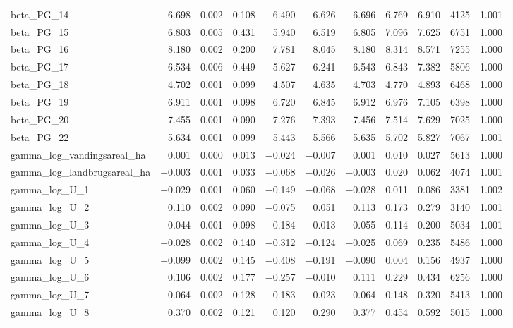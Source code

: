 \documentclass[12pt]{article}
\begin{document}
\begin{longtable}{lrrrrrrrrrr}
beta\_PG\_14 &  6.698 & 0.002 & 0.108 &  6.490 &  6.626 &  6.696 &  6.769 &  6.910 &  4125 & 1.001 \\
beta\_PG\_15 &  6.803 & 0.005 & 0.431 &  5.940 &  6.519 &  6.805 &  7.096 &  7.625 &  6751 & 1.000 \\
beta\_PG\_16 &  8.180 & 0.002 & 0.200 &  7.781 &  8.045 &  8.180 &  8.314 &  8.571 &  7255 & 1.000 \\
beta\_PG\_17 &  6.534 & 0.006 & 0.449 &  5.627 &  6.241 &  6.543 &  6.843 &  7.382 &  5806 & 1.000 \\
beta\_PG\_18 &  4.702 & 0.001 & 0.099 &  4.507 &  4.635 &  4.703 &  4.770 &  4.893 &  6468 & 1.000 \\
beta\_PG\_19 &  6.911 & 0.001 & 0.098 &  6.720 &  6.845 &  6.912 &  6.976 &  7.105 &  6398 & 1.000 \\
beta\_PG\_20 &  7.455 & 0.001 & 0.090 &  7.276 &  7.393 &  7.456 &  7.514 &  7.629 &  7025 & 1.000 \\
beta\_PG\_22 &  5.634 & 0.001 & 0.099 &  5.443 &  5.566 &  5.635 &  5.702 &  5.827 &  7067 & 1.001 \\
\addlinespace
gamma\_log\_vandingsareal\_ha  &  0.001 & 0.000 & 0.013 & $-$0.024 & $-$0.007 &  0.001 &  0.010 &  0.027 &  5613 & 1.000 \\
gamma\_log\_landbrugsareal\_ha & $-$0.003 & 0.001 & 0.033 & $-$0.068 & $-$0.026 & $-$0.003 &  0.020 &  0.062 &  4074 & 1.001 \\
gamma\_log\_U\_1  & $-$0.029 & 0.001 & 0.060 & $-$0.149 & $-$0.068 & $-$0.028 &  0.011 &  0.086 &  3381 & 1.002 \\
gamma\_log\_U\_2  &  0.110 & 0.002 & 0.090 & $-$0.075 &  0.051 &  0.113 &  0.173 &  0.279 &  3140 & 1.001 \\
gamma\_log\_U\_3  &  0.044 & 0.001 & 0.098 & $-$0.184 & $-$0.013 &  0.055 &  0.114 &  0.200 &  5034 & 1.001 \\
gamma\_log\_U\_4  & $-$0.028 & 0.002 & 0.140 & $-$0.312 & $-$0.124 & $-$0.025 &  0.069 &  0.235 &  5486 & 1.000 \\
gamma\_log\_U\_5  & $-$0.099 & 0.002 & 0.145 & $-$0.408 & $-$0.191 & $-$0.090 &  0.004 &  0.156 &  4937 & 1.000 \\
gamma\_log\_U\_6  &  0.106 & 0.002 & 0.177 & $-$0.257 & $-$0.010 &  0.111 &  0.229 &  0.434 &  6256 & 1.000 \\
gamma\_log\_U\_7  &  0.064 & 0.002 & 0.128 & $-$0.183 & $-$0.023 &  0.064 &  0.148 &  0.320 &  5413 & 1.000 \\
gamma\_log\_U\_8  &  0.370 & 0.002 & 0.121 &  0.120 &  0.290 &  0.377 &  0.454 &  0.592 &  5015 & 1.000 \\

\end{longtable}
\end{document}
